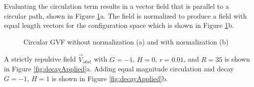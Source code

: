 \documentclass[numbered,pdftex]{ohio-etd}
\begin{document}
\noindent
Evaluating the circulation term results in a vector field that is parallel to a circular path, shown in Figure \ref{fig:gvfCircCirculation}a. The field is normalized to produce a field with equal length vectors for the configuration space which is shown in Figure \ref{fig:gvfCircCirculation}b. 

\begin{figure}[H]
	\begin{subfigmatrix}{2}%
		\centering	
		\hspace*{0mm}
	\end{subfigmatrix}
	\caption{Circular GVF without normalization (a) and with normalization (b)}
	\label{fig:gvfCircCirculation}
\end{figure}

A strictly repulsive field $\overrightarrow{V}_{obst}$ with $G=-1$, $H=0$, $r=0.01$, and $R = 35$ is shown in Figure \ref{fig:decayApplied}a. Adding equal magnitude circulation and decay $G=-1$, $H=1$ is shown in Figure \ref{fig:decayApplied}b.
\end{document}
